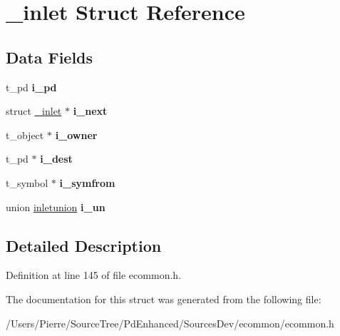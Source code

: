 \hypertarget{struct__inlet}{\section{\-\_\-inlet Struct Reference}
\label{struct__inlet}
}
\subsection*{Data Fields}
\begin{DoxyCompactItemize}
\item 
\hypertarget{struct__inlet_a2639bb3ac2a63922bf7393a675b28fd1}{t\-\_\-pd {\bfseries i\-\_\-pd}}\label{struct__inlet_a2639bb3ac2a63922bf7393a675b28fd1}

\item 
\hypertarget{struct__inlet_adb58549077d98b479e51d877e316ed31}{struct \hyperlink{struct__inlet}{\-\_\-inlet} $\ast$ {\bfseries i\-\_\-next}}\label{struct__inlet_adb58549077d98b479e51d877e316ed31}

\item 
\hypertarget{struct__inlet_aee881cb1182ca7632e843f9eb4503b30}{t\-\_\-object $\ast$ {\bfseries i\-\_\-owner}}\label{struct__inlet_aee881cb1182ca7632e843f9eb4503b30}

\item 
\hypertarget{struct__inlet_a7c16f89d729806fca332d345973b4231}{t\-\_\-pd $\ast$ {\bfseries i\-\_\-dest}}\label{struct__inlet_a7c16f89d729806fca332d345973b4231}

\item 
\hypertarget{struct__inlet_a534c2c39ea2fbb31ea35ce7eb60f8f43}{t\-\_\-symbol $\ast$ {\bfseries i\-\_\-symfrom}}\label{struct__inlet_a534c2c39ea2fbb31ea35ce7eb60f8f43}

\item 
\hypertarget{struct__inlet_a94954961ac07b15480857cece77f7065}{union \hyperlink{unioninletunion}{inletunion} {\bfseries i\-\_\-un}}\label{struct__inlet_a94954961ac07b15480857cece77f7065}

\end{DoxyCompactItemize}


\subsection{Detailed Description}


Definition at line 145 of file ecommon.\-h.



The documentation for this struct was generated from the following file\-:\begin{DoxyCompactItemize}
\item 
/\-Users/\-Pierre/\-Source\-Tree/\-Pd\-Enhanced/\-Sources\-Dev/ecommon/ecommon.\-h\end{DoxyCompactItemize}
